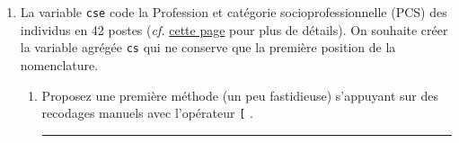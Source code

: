 \documentclass[12pt,twosided, notitlepage]{book}
\newenvironment{Shaded}{}{}
\newcommand{\KeywordTok}[1]{\textcolor[rgb]{0.00,0.00,1.00}{#1}}
\newcommand{\CommentTok}[1]{\textcolor[rgb]{0.00,0.50,0.00}{#1}}
\newcommand{\OperatorTok}[1]{#1}
\newcommand{\NormalTok}[1]{#1}
\newif \ifsol
\renewenvironment{Shaded}{\begin{snugshade}}{\end{snugshade}}
\begin{document}
\begin{enumerate}
\def\labelenumi{\alph{enumi}.}
\item
  La variable \texttt{cse} code la Profession et catégorie
  socioprofessionnelle (PCS) des individus en 42 postes (\emph{cf.}
  \href{https://www.insee.fr/fr/information/2400059}{cette page} pour
  plus de détails). On souhaite créer la variable agrégée \texttt{cs}
  qui ne conserve que la première position de la nomenclature.

  \begin{enumerate}
  \def\labelenumii{\roman{enumii}.}
  \item
    Proposez une première méthode (un peu fastidieuse) s'appuyant sur
    des recodages manuels avec l'opérateur \texttt{{[}}
    \index{\texttt{[}}.

    \ifsol 

    \begin{center} \rule{0.5\linewidth}{\linethickness}\end{center}

\begin{Shaded}
\end{Shaded}
\end{enumerate}
\end{enumerate}
\end{document}
